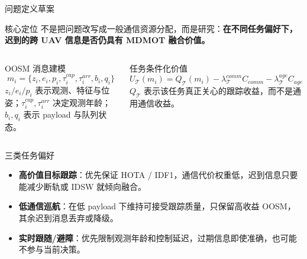 \documentclass[aspectratio=169,xcolor=dvipsnames]{beamer}
\begin{document}
\begin{frame}{问题定义草案}
\scriptsize
\begin{block}{核心定位}
不是把问题改写成一般通信资源分配，而是研究：\textbf{在不同任务偏好下，迟到的跨 UAV 信息是否仍具有 MDMOT 融合价值。}
\end{block}

\begin{columns}[T,onlytextwidth]
  \begin{block}{OOSM 消息建模}
  \[
  m_i=\{z_i,e_i,p_i,\tau_i^{cap},\tau_i^{arr},b_i,q_i\}
  \]
  \(z_i/e_i/p_i\) 表示观测、特征与位姿；\(\tau_i^{cap},\tau_i^{arr}\) 决定观测年龄；\(b_i,q_i\) 表示 payload 与队列状态。
  \end{block}

  \begin{block}{任务条件化价值}
  \[
  U_{\mathcal{T}}(m_i)
  = Q_{\mathcal{T}}(m_i)
  - \lambda_{\mathcal{T}}^{comm} C_{comm}
  - \lambda_{\mathcal{T}}^{age} C_{age}
  \]
  \(Q_{\mathcal{T}}\) 表示该任务真正关心的跟踪收益，而不是通用通信收益。
  \end{block}
\end{columns}

\begin{block}{三类任务偏好}
\begin{itemize}\setlength\itemsep{0pt}
  \item \textbf{高价值目标跟踪}：优先保证 HOTA / IDF1，通信代价权重低，迟到信息只要能减少断轨或 IDSW 就倾向融合。
  \item \textbf{低通信巡航}：在低 payload 下维持可接受跟踪质量，只保留高收益 OOSM，其余迟到消息丢弃或降级。
  \item \textbf{实时跟随/避障}：优先限制观测年龄和控制延迟，过期信息即使准确，也可能不参与当前决策。
\end{itemize}
\end{block}
\end{frame}
\end{document}
